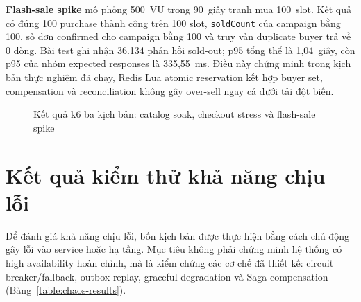\documentclass[../DoAn.tex]{subfiles}
\begin{document}
\textbf{Flash-sale spike} mô phỏng 500~VU trong 90~giây tranh mua 100~slot. Kết quả có đúng
100 purchase thành công trên 100 slot, \texttt{soldCount} của campaign bằng 100, số đơn confirmed
cho campaign bằng 100 và truy vấn duplicate buyer trả về 0 dòng. Bài test ghi nhận 36.134 phản
hồi sold-out; p95 tổng thể là 1,04~giây, còn p95 của nhóm expected responses là 335,55~ms. Điều
này chứng minh trong kịch bản thực nghiệm đã chạy, Redis Lua atomic reservation kết hợp buyer
set, compensation và reconciliation không gây over-sell ngay cả dưới tải đột biến.

\begin{figure}[!htbp]
    \centering
    \caption{Kết quả k6 ba kịch bản: catalog soak, checkout stress và flash-sale spike}
    \label{fig:perf-results}
\end{figure}

\section{Kết quả kiểm thử khả năng chịu lỗi}
\label{section:5.10}

Để đánh giá khả năng chịu lỗi, bốn kịch bản được thực hiện bằng cách chủ động gây lỗi vào
service hoặc hạ tầng. Mục tiêu không phải chứng minh hệ thống có high availability hoàn chỉnh,
mà là kiểm chứng các cơ chế đã thiết kế: circuit breaker/fallback, outbox replay, graceful
degradation và Saga compensation (Bảng~\ref{table:chaos-results}).
\end{document}
